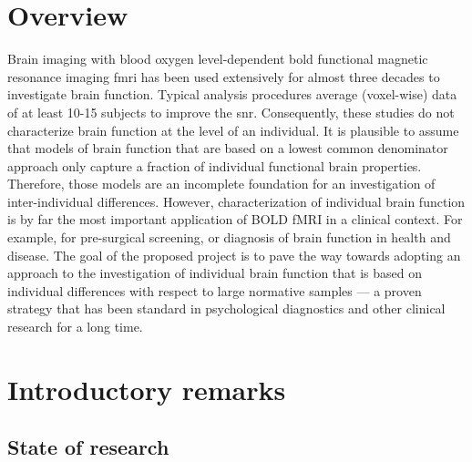 \section{Overview}


%
Brain imaging with blood oxygen level-dependent \ac{bold} functional magnetic
resonance imaging \ac{fmri} has been used extensively for almost three decades
to investigate brain function.
%
Typical analysis procedures average (voxel-wise) data of at least 10-15 subjects
to improve the \ac{snr}.
%
Consequently, these studies do not characterize brain function at the level of
an individual.
%
It is plausible to assume that models of brain function that are based on a
lowest common denominator approach only capture a fraction of individual
functional brain properties.
%
Therefore, those models are an incomplete foundation for an investigation of
inter-individual differences.
%
However, characterization of individual brain function is by far the most
important application of BOLD fMRI in a clinical context.
%
For example, for pre-surgical screening, or diagnosis of brain function in
health and disease.
%
The goal of the proposed project is to pave the way towards adopting an approach
to the investigation of individual brain function that is based on individual
differences with respect to large normative samples --- a proven strategy that
has been standard in psychological diagnostics and other clinical research for a
long time.


\section{Introductory remarks}


\subsection{State of research}


